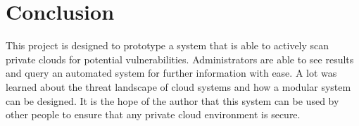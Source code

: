 \documentclass[12pt]{article}
\begin{document}
\section{Conclusion}
This project is designed to prototype a system that is able to actively scan private clouds for potential vulnerabilities. Administrators are able to see results and query an automated system for further information with ease. A lot was learned about the threat landscape of cloud systems and how a modular system can be designed. It is the hope of the author that this system can be used by other people to ensure that any private cloud environment is secure.  



\newpage


\newpage
\appendix
\section{}

\end{document}
